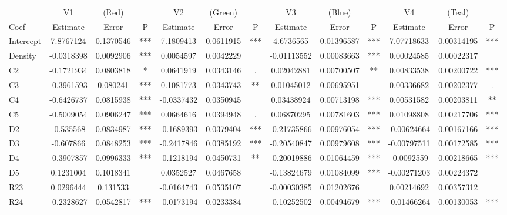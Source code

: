 \documentclass[11pt,letterpaper]{article}
\numberwithin{equation}{section}
\numberwithin{equation}{section}
\numberwithin{equation}{section}
\begin{document}
\begin{center}
\begin{sideways}
\begin{tabular}{|l|ccc|ccc|ccc|ccc|}
\hline\hline
         & V1         & (Red)     &    & V2         & (Green)   &    & V3          & (Blue)     &    & V4          & (Teal)     &    \\
Coef      & Estimate   & Error     & P   & Estimate   & Error     & P   & Estimate    & Error      & P   & Estimate    & Error      & P   \\ \hline
Intercept & 7.8767124  & 0.1370546 & *** & 7.1809413  & 0.0611915 & *** & 4.6736565   & 0.01396587 & *** & 7.07718633  & 0.00314195 & *** \\
Density   & -0.0318398 & 0.0092906 & *** & 0.0054597  & 0.0042229 &     & -0.01113552 & 0.00083663 & *** & 0.00024585  & 0.00022317 &     \\
C2        & -0.1721934 & 0.0803818 & *   & 0.0641919  & 0.0343146 & .   & 0.02042881  & 0.00700507 & **  & 0.00833538  & 0.00200722 & *** \\
C3        & -0.3961593 & 0.080241  & *** & 0.1081773  & 0.0343743 & **  & 0.01045012  & 0.00695951 &     & 0.00336682  & 0.00202377 & .   \\
C4        & -0.6426737 & 0.0815938 & *** & -0.0337432 & 0.0350945 &     & 0.03438924  & 0.00713198 & *** & 0.00531582  & 0.00203811 & **  \\
C5        & -0.5009054 & 0.0906247 & *** & 0.0664616  & 0.0394948 & .   & 0.06870295  & 0.00781603 & *** & 0.01098808  & 0.00217706 & *** \\
D2        & -0.535568  & 0.0834987 & *** & -0.1689393 & 0.0379404 & *** & -0.21735866 & 0.00976054 & *** & -0.00624664 & 0.00167166 & *** \\
D3        & -0.607866  & 0.0848253 & *** & -0.2417846 & 0.0385192 & *** & -0.20540847 & 0.00979608 & *** & -0.00797511 & 0.00172585 & *** \\
D4        & -0.3907857 & 0.0996333 & *** & -0.1218194 & 0.0450731 & **  & -0.20019886 & 0.01064459 & *** & -0.0092559  & 0.00218665 & *** \\
D5        & 0.1231004  & 0.1018341 &     & 0.0352527  & 0.0467658 &     & -0.13824679 & 0.01084099 & *** & -0.00271203 & 0.00224372 &     \\
R23       & 0.0296444  & 0.131533  &     & -0.0164743 & 0.0535107 &     & -0.00030385 & 0.01202676 &     & 0.00214692  & 0.00357312 &     \\
R24       & -0.2328627 & 0.0542817 & *** & -0.0173194 & 0.0233384 &     & -0.10252502 & 0.00494679 & *** & -0.01466264 & 0.00130053 & *** \\

\end{tabular}
\end{sideways}
\end{center}
\end{document}
